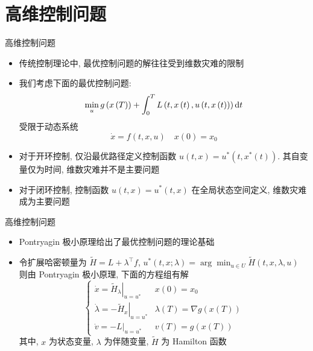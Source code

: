 \documentclass[aspectratio=169]{beamer}
\def\dif{\mathinner{\mathrm{d}}\hphantom{\mskip-\thinmuskip}}
\begin{document}
	\section{高维控制问题}
	\begin{frame}{高维控制问题}
		\begin{itemize}
			\item 传统控制理论中, 最优控制问题的解往往受到维数灾难的限制
			\item 我们考虑下面的最优控制问题:
				\begin{equation*}
					\min_{u} g\left(x\left(T\right)\right) + \int_{0}^{T} L\left(t, x\left(t\right), u\left(t, x\left(t\right)\right)\right) \dif t
				\end{equation*}
				受限于动态系统
				\begin{equation*}
					\dot{x} = f\left(t, x, u\right) \quad x\left(0\right) = x_{0}
				\end{equation*}
			\item 对于开环控制, 仅沿最优路径定义控制函数 $u\left(t, x\right) = u^{*}\left(t, x^{*}\left(t\right)\right)$. 其自变量仅为时间, 维数灾难并不是主要问题
			\item 对于闭环控制, 控制函数 $u\left(t, x\right) = u^{*}\left(t, x\right)$ 在全局状态空间定义, 维数灾难成为主要问题
		\end{itemize}
	\end{frame}

	\begin{frame}{高维控制问题}
		\begin{itemize}
			\item Pontryagin 极小原理给出了最优控制问题的理论基础
			\item 令扩展哈密顿量为 $\tilde{H} = L + \lambda^{\top} f$, $u^{*}\left(t, x; \lambda\right) = \arg\min_{u\in U} \tilde{H}\left(t, x, \lambda, u\right)$ 则由 Pontryagin 极小原理, 下面的方程组有解
				\begin{equation*}
					\left\{
						\begin{array}{ll}
							\left.\dot{x} = \tilde{H}_{\lambda}\right|_{u = u^{*}}	& x\left(0\right) = x_{0}										\\
							\left.\dot{\lambda} = -\tilde{H}_{x}\right|_{u = u^{*}}	& \lambda\left(T\right) = \nabla g\left(x\left(T\right)\right)	\\
							\left.\dot{v} = -L\right|_{u = u^{*}}											& v\left(T\right) = g\left(x\left(T\right)\right)
						\end{array}
					\right.
				\end{equation*}
				其中, $x$ 为状态变量, $\lambda$ 为伴随变量, $\tilde{H}$ 为 Hamilton 函数
		\end{itemize}
	\end{frame}
\end{document}
